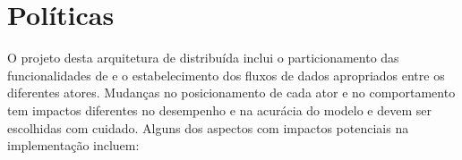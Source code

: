 \section{Políticas}\label{sec:polices}

O projeto desta arquitetura de \nd distribuída inclui o particionamento das
funcionalidades de \minas e o estabelecimento dos fluxos de dados apropriados
entre os diferentes atores.
Mudanças no posicionamento de cada ator e no comportamento tem impactos
diferentes no desempenho e na acurácia do modelo e devem ser escolhidas com
cuidado.
% 
Alguns dos aspectos com impactos potenciais na implementação incluem:

